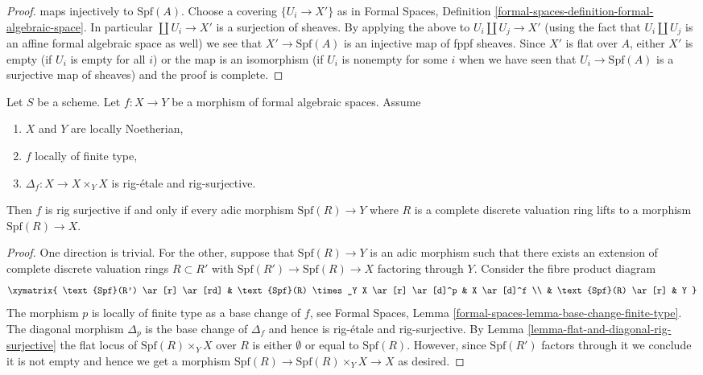 \begin{proof}
maps injectively to $\text{Spf}(A)$.
Choose a covering $\{U_i \to X'\}$ as in Formal Spaces, Definition
\ref{formal-spaces-definition-formal-algebraic-space}.
In particular $\coprod U_i \to X'$ is a surjection of sheaves.
By applying the above to $U_i \coprod U_j \to X'$ (using the
fact that $U_i \amalg U_j$ is an affine formal algebraic space
as well) we see that $X' \to \text{Spf}(A)$ is an injective map
of fppf sheaves. Since $X'$ is flat over $A$, either $X'$ is empty
(if $U_i$ is empty for all $i$) or the map is an isomorphism
(if $U_i$ is nonempty for some $i$ when we have seen that
$U_i \to \text{Spf}(A)$ is a surjective map of sheaves)
and the proof is complete.
\end{proof}

\begin{lemma}
\label{lemma-rig-monomorphism-rig-surjective}
Let $S$ be a scheme. Let $f : X \to Y$ be a morphism of formal algebraic
spaces. Assume
\begin{enumerate}
\item $X$ and $Y$ are locally Noetherian,
\item $f$ locally of finite type,
\item $\Delta_f : X \to X \times_Y X$ is rig-\'etale and rig-surjective.
\end{enumerate}
Then $f$ is rig surjective if and only if every adic morphism
$\text{Spf}(R) \to Y$ where $R$ is a complete discrete
valuation ring lifts to a morphism $\text{Spf}(R) \to X$.
\end{lemma}

\begin{proof}
One direction is trivial. For the other, suppose that $\text{Spf}(R) \to Y$
is an adic morphism such that there exists an extension of complete
discrete valuation rings $R \subset R'$ with
$\text{Spf}(R') \to \text{Spf}(R) \to X$ factoring through $Y$.
Consider the fibre product diagram
$$
\xymatrix{
\text{Spf}(R') \ar[r] \ar[rd] &
\text{Spf}(R) \times_Y X \ar[r] \ar[d]^p &
X \ar[d]^f \\
&
\text{Spf}(R) \ar[r] &
Y
}
$$
The morphism $p$ is locally of finite type as a base change of $f$, see
Formal Spaces, Lemma
\ref{formal-spaces-lemma-base-change-finite-type}.
The diagonal morphism $\Delta_p$ is the base change of
$\Delta_f$ and hence is rig-\'etale and rig-surjective.
By Lemma \ref{lemma-flat-and-diagonal-rig-surjective}
the flat locus of $\text{Spf}(R) \times_Y X$ over $R$
is either $\emptyset$ or equal to $\text{Spf}(R)$.
However, since $\text{Spf}(R')$ factors through it
we conclude it is not empty and hence
we get a morphism $\text{Spf}(R) \to \text{Spf}(R) \times_Y X \to X$
as desired.
\end{proof}










